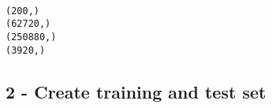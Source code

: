 \documentclass[11pt]{article}
\begin{document}
    \begin{center}
    \end{center}
    { \hspace*{\fill} \\}
    
    \begin{Verbatim}[commandchars=\\\{\}]
(200,)
(62720,)
(250880,)
(3920,)

    \end{Verbatim}

    \subsection{2 - Create training and test
set}\label{create-training-and-test-set}
\end{document}
